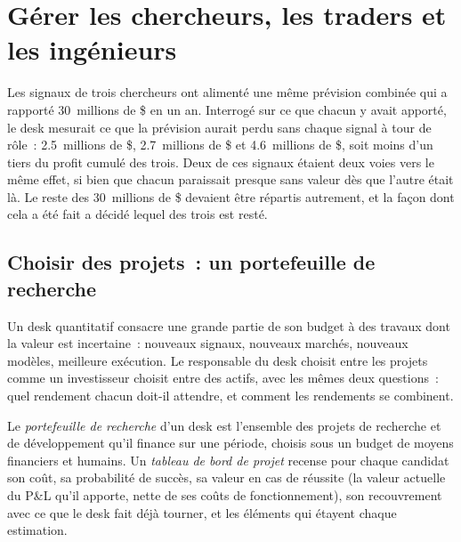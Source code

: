 \chapter{Gérer les chercheurs, les traders et les ingénieurs}\label{ch:fm:managing-researchers-traders-and-engineers}

Les signaux de trois chercheurs ont alimenté une même prévision combinée qui a rapporté 30~millions de \$ en un an. Interrogé sur ce que chacun y avait apporté, le desk mesurait
ce que la prévision aurait perdu sans chaque signal à tour de rôle~: 2.5~millions de \$, 2.7~millions de \$ et 4.6~millions de \$, soit moins d'un tiers du profit
cumulé des trois. Deux de ces signaux étaient deux voies vers le même effet, si bien que chacun paraissait presque sans valeur dès que l'autre était là. Le reste des
30~millions de \$ devaient être répartis autrement, et la façon dont cela a été fait a décidé lequel des trois est resté.

\section{Choisir des projets~: un portefeuille de recherche}

Un desk quantitatif consacre une grande partie de son budget à des travaux dont la valeur est incertaine~: nouveaux signaux, nouveaux marchés, nouveaux modèles, meilleure exécution. Le
responsable du desk choisit entre les projets comme un investisseur choisit entre des actifs, avec les mêmes deux questions~: quel rendement chacun doit-il attendre, et comment
les rendements se combinent.

\begin{definition}\label{def:fm:managing-researchers-traders-and-engineers:portfolio}
Le \emph{portefeuille de recherche} d'un desk est l'ensemble des projets de recherche et de développement qu'il finance sur une période, choisis sous un
budget de moyens financiers et humains. Un \emph{tableau de bord de projet} recense pour chaque candidat son coût, sa probabilité de succès, sa valeur en cas
de réussite (la valeur actuelle du P\&L qu'il apporte, nette de ses coûts de fonctionnement), son recouvrement avec ce que le desk fait déjà tourner, et les éléments
qui étayent chaque estimation.
\end{definition}

